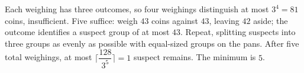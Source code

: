 Each weighing has three outcomes, so four weighings distinguish at most $3^4=81$ coins, insufficient. Five suffice: weigh $43$ coins against $43$, leaving $42$ aside; the outcome identifies a suspect group of at most $43$. Repeat, splitting suspects into three groups as evenly as possible with equal-sized groups on the pans. After five total weighings, at most $\lceil\dfrac{128}{3^5}\rceil=1$ suspect remains. The minimum is $\boxed5$.
